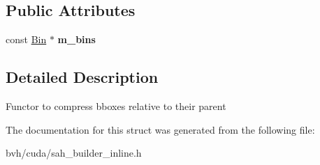 \subsection*{\-Public \-Attributes}
\begin{DoxyCompactItemize}
\item 
\hypertarget{structnih_1_1cuda_1_1sah_1_1_bbox__compressor_a78323594f0e153df8c53da4238da5b03}{
const \hyperlink{structnih_1_1cuda_1_1sah_1_1_bin}{\-Bin} $\ast$ {\bfseries m\-\_\-bins}}
\label{structnih_1_1cuda_1_1sah_1_1_bbox__compressor_a78323594f0e153df8c53da4238da5b03}

\end{DoxyCompactItemize}


\subsection{\-Detailed \-Description}
\-Functor to compress bboxes relative to their parent 

\-The documentation for this struct was generated from the following file\-:\begin{DoxyCompactItemize}
\item 
bvh/cuda/sah\-\_\-builder\-\_\-inline.\-h\end{DoxyCompactItemize}
